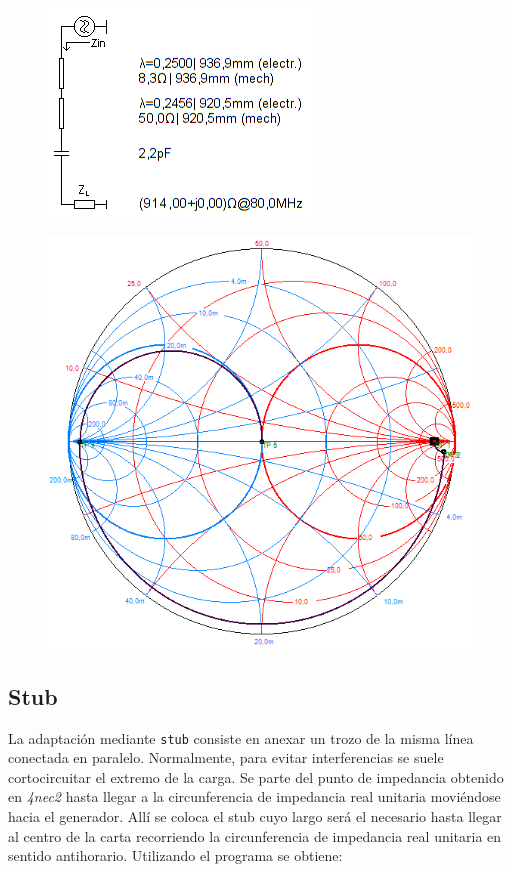 \begin{figure}[H]
	\centering
	\includegraphics[scale=0.83]{imagenes/smith_4_espacio_libre_esq.png}
	\label{fig.smith_4_esq}
\end{figure}
\begin{figure}[H]
	\centering
	\includegraphics[scale=0.63]{imagenes/smith_4_espacio_libre.png}
	\label{fig.smith_4}
\end{figure}



\subsection{Stub}

La adaptación mediante \texttt{stub} consiste en anexar un trozo de la misma línea conectada en paralelo. Normalmente, para evitar interferencias se suele cortocircuitar el extremo de la carga. Se parte del punto de impedancia obtenido en \emph{4nec2} hasta llegar a la circunferencia de impedancia real unitaria moviéndose hacia el generador. Allí se coloca el stub cuyo largo será el necesario hasta llegar al centro de la carta recorriendo la circunferencia de impedancia real unitaria en sentido antihorario. Utilizando el programa se obtiene:

